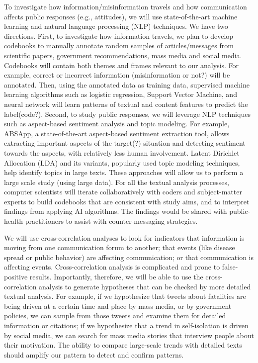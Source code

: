 

To investigate how information/misinformation travels and how communication affects public responses (e.g., attitudes), we will use state-of-the-art machine learning and natural language processing (NLP) techniques. We have two directions. First, to investigate how information travels, we plan to develop codebooks to manually annotate random samples of articles/messages from scientific papers, government recommendations, mass media and social media. Codebooks will contain both themes and frames relevant to our analysis. For example, correct or incorrect information (misinformation or not?) will be annotated. Then, using the annotated data as training data, supervised machine learning algorithms such as logistic regression, Support Vector Machine, and neural network will learn patterns of textual and content features to predict the label(code?). Second, to study public responses, we will leverage NLP techniques such as aspect-based sentiment analysis and topic modeling. For example, ABSApp, a state-of-the-art aspect-based sentiment extraction tool, allows extracting important aspects of the target(?) situation and detecting sentiment towards the aspects, with relatively less human involvement. Latent Dirichlet Allocation (LDA) and its variants, popularly used topic modeling techniques, help identify topics in large texts. These approaches will allow us to perform a large scale study (using large data). For all the textual analysis processes, computer scientists will iterate collaboratively with coders and subject-matter experts to build codebooks that are consistent with study aims, and to interpret findings from applying AI algorithms. The findings would be shared with public-health practitioners to assist with counter-messaging strategies. 



We will use cross-correlation analyses to look for indicators that information is moving from one communication forum to another; that events (like disease spread or public behavior) are affecting communication; or that communication is affecting events. 
Cross-correlation analysis is complicated and prone to false-positive results. Importantly, therefore, we will be able to use the cross-correlation analysis to generate hypotheses that can be checked by more detailed textual analysis. For example, if we hypothesize that tweets about fatalities are being driven at a certain time and place by mass media, or by government policies, we can sample from those tweets and examine them for detailed information or citations; if we hypothesize that a trend in self-isolation is driven by social media, we can search for mass media stories that interview people about their motivation. The ability to compare large-scale trends with detailed texts should amplify our pattern to detect and confirm patterns. 

